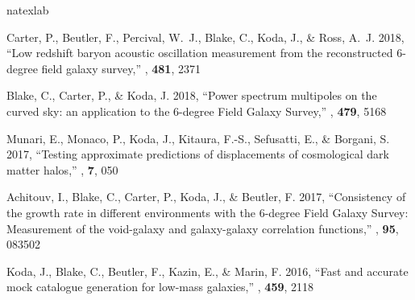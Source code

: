 
\renewcommand{\section}[2]{\vspace{2\baselineskip}\refstepcounter{section}{\bf \textsf{#2}}\vspace{0.25\baselineskip}}
\renewcommand{\refname}{Refereed Publications}
\begin{thebibliography}{8}
\expandafter\ifx\csname natexlab\endcsname\relax\def\natexlab#1{#1}\fi

{Carter}, P., {Beutler}, F., {Percival}, W.~J., {Blake}, C., {Koda}, J., \&
  {Ross}, A.~J. 2018, ``{Low redshift baryon acoustic oscillation measurement
  from the reconstructed 6-degree field galaxy survey},'' {\em \mnras\/}, {\bf
  481}, 2371

{Blake}, C., {Carter}, P., \& {Koda}, J. 2018, ``{Power spectrum multipoles on
  the curved sky: an application to the 6-degree Field Galaxy Survey},'' {\em
  \mnras\/}, {\bf 479}, 5168

{Munari}, E., {Monaco}, P., {Koda}, J., {Kitaura}, F.-S., {Sefusatti}, E., \&
  {Borgani}, S. 2017, ``{Testing approximate predictions of displacements of
  cosmological dark matter halos},'' {\em \jcap\/}, {\bf 7}, 050

{Achitouv}, I., {Blake}, C., {Carter}, P., {Koda}, J., \& {Beutler}, F. 2017,
  ``{Consistency of the growth rate in different environments with the 6-degree
  Field Galaxy Survey: Measurement of the void-galaxy and galaxy-galaxy
  correlation functions},'' {\em \prd\/}, {\bf 95}, 083502

{Koda}, J., {Blake}, C., {Beutler}, F., {Kazin}, E., \& {Marin}, F. 2016,
  ``{Fast and accurate mock catalogue generation for low-mass galaxies},'' {\em
  \mnras\/}, {\bf 459}, 2118


\end{thebibliography}
